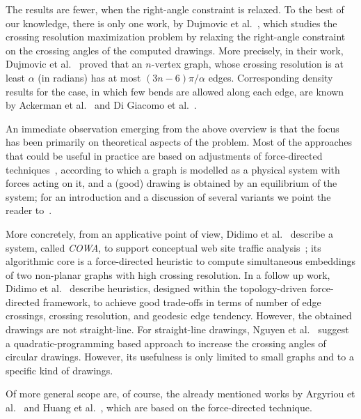 \documentclass{comjnl}
\begin{document}
The results are fewer, when the right-angle constraint is relaxed. To the best of our knowledge, there is only one work, by Dujmovic et al.~\cite{DBLP:journals/cjtcs/DujmovicGMW11}, which studies the crossing resolution maximization problem by relaxing the right-angle constraint on the crossing angles of the computed drawings. More precisely, in their work, Dujmovic et al.~\cite{DBLP:journals/cjtcs/DujmovicGMW11} proved that an $n$-vertex graph, whose crossing resolution is at least $\alpha$ (in radians) has at most $(3n-6)\pi/\alpha$ edges. Corresponding density results for the case, in which few bends are allowed along each edge, are known by Ackerman et al.~\cite{DBLP:journals/siamdm/AckermanFT12} and Di Giacomo et al.~\cite{DBLP:journals/mst/GiacomoDLM11}.

An immediate observation emerging from the above overview is that the focus has been primarily on theoretical aspects of the problem. Most of the approaches that could be useful in practice are based on adjustments of force-directed techniques~\cite{DBLP:journals/congnum/Eades84}, according to which a graph is modelled as a physical system with forces acting on it, and a (good) drawing is obtained by an equilibrium of the system; for an introduction and a discussion of several variants we point the reader to~\cite{DBLP:books/ph/BattistaETT99}. 

More concretely, from an applicative point of view, Didimo et al.~\cite{DBLP:conf/apvis/DidimoLR10} describe a system, called \emph{COWA},  to support conceptual web site traffic analysis~\cite{DBLP:conf/apvis/DidimoLR10}; its algorithmic core is a force-directed heuristic to compute simultaneous embeddings of two non-planar graphs with high crossing resolution.
%
In a follow up work, Didimo et al.~\cite{DBLP:conf/gd/DidimoLR10} describe heuristics, designed within the topology-driven force-directed framework, to achieve good trade-offs in terms of number of edge crossings, crossing resolution, and geodesic edge tendency.
%
However, the obtained drawings are not straight-line. For straight-line drawings, Nguyen et al.~\cite{DBLP:conf/gd/NguyenEHH10} suggest a quadratic-programming based approach to increase the crossing angles of circular drawings. However, its usefulness is only limited to small graphs and to a specific kind of drawings.

Of more general scope are, of course, the already mentioned works by Argyriou et al.~\cite{DBLP:journals/cj/ArgyriouBS13} and Huang et al.~\cite{DBLP:journals/vlc/HuangEHL13}, which are based on the force-directed technique.
\end{document}
